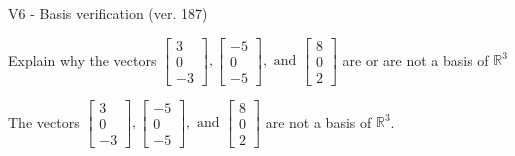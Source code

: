 \begin{exercise}
  \begin{exerciseTitle}V6 - Basis verification (ver. 187)\end{exerciseTitle}
  \begin{exerciseStatement}
    Explain why the vectors \(\left[\begin{array}{r}
3 \\
0 \\
-3
\end{array}\right] , \left[\begin{array}{r}
-5 \\
0 \\
-5
\end{array}\right] , \text{ and } \left[\begin{array}{r}
8 \\
0 \\
2
\end{array}\right]\) are or are not a basis of \(\mathbb{R}^3\)	


  \end{exerciseStatement}
  \begin{exerciseAnswer}
   The vectors \(\left[\begin{array}{r}
3 \\
0 \\
-3
\end{array}\right] , \left[\begin{array}{r}
-5 \\
0 \\
-5
\end{array}\right] , \text{ and } \left[\begin{array}{r}
8 \\
0 \\
2
\end{array}\right]\) 
  	 are not  a basis of \(\mathbb{R}^3\).
  


  \end{exerciseAnswer}
\end{exercise}